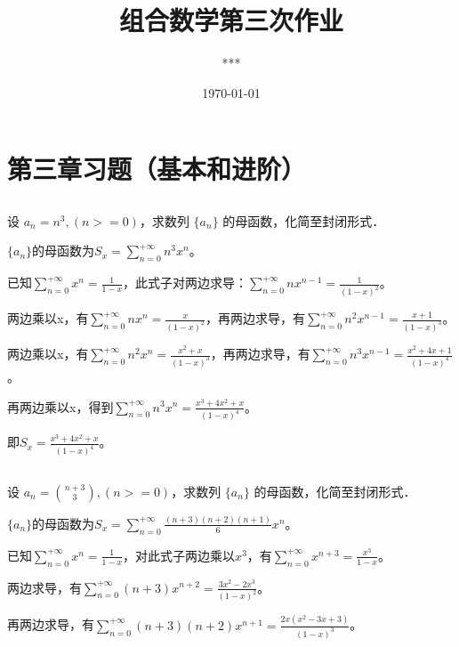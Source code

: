 \documentclass[UTF8]{ctexart}
\title{组合数学第三次作业}
\author{***}
\date{\today}
\begin{document}
\fancyfoot[C]{\thepage}

\maketitle

\section{第三章习题（基本和进阶）}

\subsection{}

设 $a_{n}= n^{3},(n >= 0)$，求数列 $\{a_{n}\}$ 的母函数，化简至封闭形式．

$\{a_{n}\}$的母函数为$S_{x}=\sum_{n=0}^{+\infty}{n^{3}x^{n}}$。

已知$\sum_{n=0}^{+\infty}{x^{n}}=\frac{1}{1-x}$，此式子对两边求导：$\sum_{n=0}^{+\infty}{nx^{n-1}}=\frac{1}{(1-x)^{2}}$。

两边乘以x，有$\sum_{n=0}^{+\infty}{nx^{n}}=\frac{x}{(1-x)^{2}}$，再两边求导，有$\sum_{n=0}^{+\infty}{n^{2}x^{n-1}}=\frac{x+1}{(1-x)^{3}}$。

两边乘以x，有$\sum_{n=0}^{+\infty}{n^{2}x^{n}}=\frac{x^{2}+x}{(1-x)^{3}}$，再两边求导，有$\sum_{n=0}^{+\infty}{n^{3}x^{n-1}}=\frac{x^{2}+4x+1}{(1-x)^{4}}$。

再两边乘以x，得到$\sum_{n=0}^{+\infty}{n^{3}x^{n}}=\frac{x^{3}+4x^{2}+x}{(1-x)^{4}}$。

即$S_{x}=\frac{x^{3}+4x^{2}+x}{(1-x)^{4}}$。

\subsection{}
设 $a_{n}= \binom{n+3}{3},(n >= 0)$，求数列 $\{a_{n}\}$ 的母函数，化简至封闭形式．

$\{a_{n}\}$的母函数为$S_{x}=\sum_{n=0}^{+\infty}{\frac{(n+3)(n+2)(n+1)}{6}x^{n}}$。

已知$\sum_{n=0}^{+\infty}{x^{n}}=\frac{1}{1-x}$，对此式子两边乘以$x^{3}$，有$\sum_{n=0}^{+\infty}{x^{n+3}}=\frac{x^{3}}{1-x}$。

两边求导，有$\sum_{n=0}^{+\infty}{(n+3)x^{n+2}}=\frac{3x^{2}-2x^{3}}{(1-x)^{2}}$。

再两边求导，有$\sum_{n=0}^{+\infty}{(n+3)(n+2)x^{n+1}}=\frac{2x(x^{2}-3x+3)}{(1-x)^{3}}$。
\end{document}
